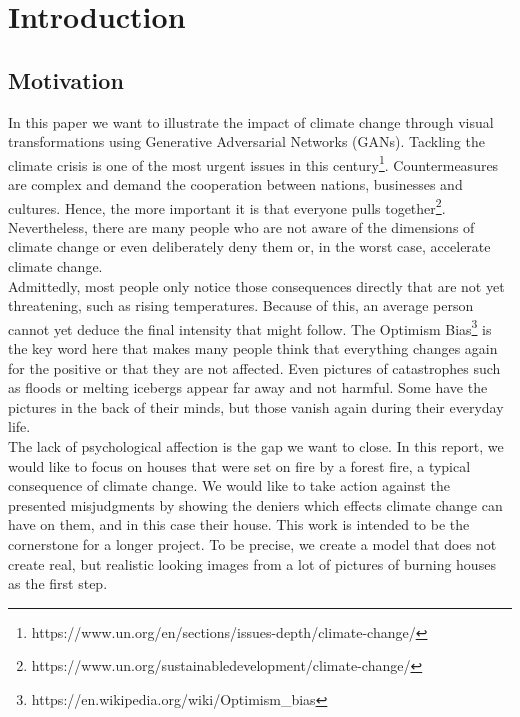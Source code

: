 \section{Introduction}
    \subsection{Motivation}\label{Motivation}
	In this paper we want to illustrate the impact of climate change through visual transformations using Generative Adversarial Networks (GANs). 
	Tackling the climate crisis is one of the most urgent issues in this century\footnote{https://www.un.org/en/sections/issues-depth/climate-change/}. Countermeasures are complex and demand the cooperation between nations, businesses and cultures. Hence, the more important it is that everyone pulls together\footnote{https://www.un.org/sustainabledevelopment/climate-change/}. Nevertheless, there are many people who are not aware of the dimensions of climate change or even deliberately deny them or, in the worst case, accelerate climate change. \\
	Admittedly, most people only notice those consequences directly that are not yet threatening, such as rising temperatures. Because of this, an average person cannot yet deduce the final intensity that might follow. The Optimism Bias\footnote{https://en.wikipedia.org/wiki/Optimism\_bias} is the key word here that makes many people think that everything changes again for the positive or that they are not affected.
	Even pictures of catastrophes such as floods or melting icebergs appear far away and not harmful. Some have the pictures in the back of their minds, but those vanish again during their everyday life. \\
	The lack of psychological affection\cite{behavioural} is the gap we want to close. In this report, we would like to focus on houses that were set on fire by a forest fire, a typical consequence of climate change.
	We would like to take action against the presented misjudgments by showing the deniers which effects climate change can have on them, and in this case their house. This work is intended to be the cornerstone for a longer project. To be precise, we create a model that does not create real, but realistic looking images from a lot of pictures of burning houses as the first step.\\
    